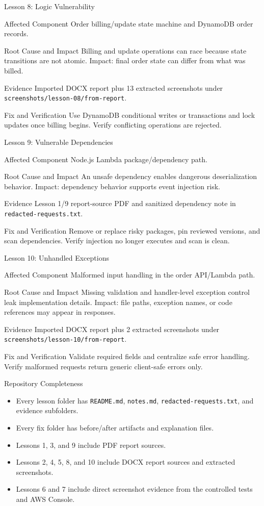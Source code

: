 \documentclass[aspectratio=169,11pt]{beamer}
\newcommand{\lessonframe}[5]{
\begin{frame}{#1}
  \small
  \begin{block}{Affected Component}
    #2
  \end{block}
  \begin{block}{Root Cause and Impact}
    #3
  \end{block}
  \begin{block}{Evidence}
    #4
  \end{block}
  \begin{block}{Fix and Verification}
    #5
  \end{block}
\end{frame}
}
\begin{document}
\lessonframe
{Lesson 8: Logic Vulnerability}
{Order billing/update state machine and DynamoDB order records.}
{Billing and update operations can race because state transitions are not atomic. Impact: final order state can differ from what was billed.}
{Imported DOCX report plus 13 extracted screenshots under \texttt{screenshots/lesson-08/from-report}.}
{Use DynamoDB conditional writes or transactions and lock updates once billing begins. Verify conflicting operations are rejected.}

\lessonframe
{Lesson 9: Vulnerable Dependencies}
{Node.js Lambda package/dependency path.}
{An unsafe dependency enables dangerous deserialization behavior. Impact: dependency behavior supports event injection risk.}
{Lesson 1/9 report-source PDF and sanitized dependency note in \texttt{redacted-requests.txt}.}
{Remove or replace risky packages, pin reviewed versions, and scan dependencies. Verify injection no longer executes and scan is clean.}

\lessonframe
{Lesson 10: Unhandled Exceptions}
{Malformed input handling in the order API/Lambda path.}
{Missing validation and handler-level exception control leak implementation details. Impact: file paths, exception names, or code references may appear in responses.}
{Imported DOCX report plus 2 extracted screenshots under \texttt{screenshots/lesson-10/from-report}.}
{Validate required fields and centralize safe error handling. Verify malformed requests return generic client-safe errors only.}

\begin{frame}{Repository Completeness}
  \begin{itemize}
    \item Every lesson folder has \texttt{README.md}, \texttt{notes.md}, \texttt{redacted-requests.txt}, and evidence subfolders.
    \item Every fix folder has before/after artifacts and explanation files.
    \item Lessons 1, 3, and 9 include PDF report sources.
    \item Lessons 2, 4, 5, 8, and 10 include DOCX report sources and extracted screenshots.
    \item Lessons 6 and 7 include direct screenshot evidence from the controlled tests and AWS Console.
  \end{itemize}
\end{frame}
\end{document}

